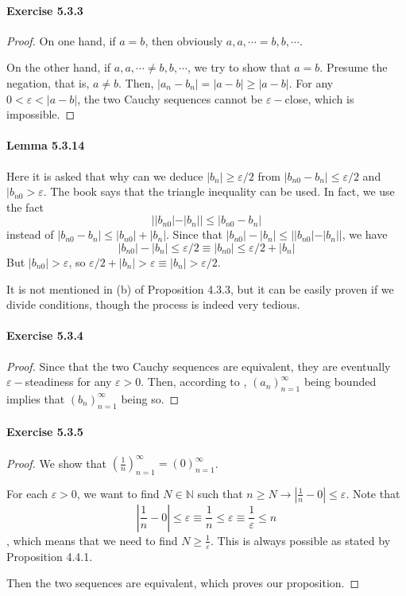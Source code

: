 \paragraph{Exercise 5.3.3} \label{exercise5.3.3}
\begin{proof}
On one hand, if $a=b$, then obviously $a,a,\cdots = b,b,\cdots$. 

On the other hand, if $a,a,\cdots \neq b,b,\cdots$, we try to show that $a=b$. Presume the negation, that is, 
$a \neq b$. Then, $|a_n-b_n| = |a-b| \geq |a-b|$. For any $0<\varepsilon< |a-b|$, the two Cauchy sequences cannot be 
$\varepsilon-$close, which is impossible.
\end{proof}

\paragraph{Lemma 5.3.14}
Here it is asked that why can we deduce $|b_n| \geq \varepsilon/2$ from $|b_{n0} - b_n| \leq \varepsilon/2$ and 
$|b_{n0} > \varepsilon$. The book says that the triangle inequality can be used. In fact, we use the fact 
\[
||b_{n0}| - |b_n|| \leq |b_{n0} - b_n|
\]
instead of $|b_{n0} - b_n| \leq |b_{n0}| + |b_n|$. Since that $|b_{n0}| - |b_n| \leq ||b_{n0}| - |b_n||$, 
we have 
\[
|b_{n0}| - |b_n| \leq \varepsilon/2 \equiv |b_{n0}| \leq \varepsilon/2 + |b_n|
\]
But $|b_{n0}| > \varepsilon$, so $\varepsilon/2 + |b_n| > \varepsilon \equiv |b_n| > \varepsilon/2$.

It is not mentioned in (b) of Proposition 4.3.3, but it can be easily proven if we divide conditions, though 
the process is indeed very tedious.

\paragraph{Exercise 5.3.4} \label{exercise5.3.4}
\begin{proof}
Since that the two Cauchy sequences are equivalent, they are eventually $\varepsilon-$steadiness for any $\varepsilon>0$. 
Then, according to , $(a_n)^\infty_{n=1}$ being bounded implies that $(b_n)^\infty_{n=1}$ being so.
\end{proof}

\paragraph{Exercise 5.3.5} \label{exercise5.3.5}
\begin{proof}
We show that $(\frac{1}{n})^\infty_{n=1} = (0)^\infty_{n=1}$.

For each $\varepsilon>0$, we want to find $N \in \mathbb{N}$ such that 
$n\geq N \longrightarrow |\frac{1}{n}-0|\leq \varepsilon$. Note that 
\[
|\frac{1}{n}-0|\leq \varepsilon \equiv \frac{1}{n} \leq \varepsilon \equiv \frac{1}{\varepsilon} \leq n
\], 
which means that we need to find $N \geq \frac{1}{\varepsilon}$. This is always possible as stated by Proposition 4.4.1.

Then the two sequences are equivalent, which proves our proposition.
\end{proof}

